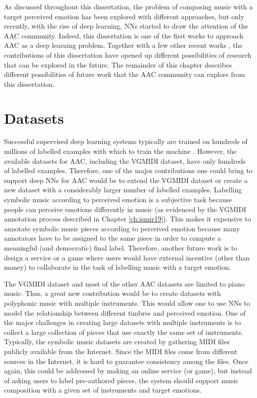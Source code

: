 As discussed throughout this dissertation, the problem of composing music with a target perceived emotion has been explored with different approaches, but only recently, with the rise of deep learning, NNs started to draw the attention of the AAC community.  Indeed, this dissertation is one of the first works to approach AAC as a deep learning problem. Together with a few other recent works \cite{madhok2018sentimozart,tan2020automated,zhao2019emotional, tan2020music}, the contributions of this dissertation have opened up different possibilities of research that can be explored in the future. The remainder of this chapter describes different possibilities of future work that the AAC community can explore from this dissertation.

\section{Datasets}

Successful supervised deep learning systems typically are trained on hundreds of millions of labelled examples with which to train the machine \cite{lecun2015deep}. However, the available datasets for AAC, including the VGMIDI dataset, have only hundreds of labelled examples. Therefore, one of the major contributions one could bring to support deep NNs for AAC would be to extend the VGMIDI dataset or create a new dataset with a considerably larger number of labelled examples. Labelling symbolic music according to perceived emotion is a subjective task because people can perceive emotions differently in music (as evidenced by the VGMIDI annotation process described in Chapter \ref{ch:ismir19}). This makes it expensive to annotate symbolic music pieces according to perceived emotion because many annotators have to be assigned to the same piece in order to compute a meaningful (and democratic) final label. Therefore, another future work is to design a service or a game \cite{Law2007TagATuneAG} where users would have external incentive (other than money) to collaborate in the task of labelling music with a target emotion.

The VGMIDI dataset and most of the other AAC datasets are limited to piano music. Thus, a great new contribution would be to create datasets with polyphonic music with multiple instruments. This would allow one to use NNs to model the relationship between different timbres and perceived emotion. One of the major challenges in creating large datasets with multiple instruments is to collect a large collection of pieces that use exactly the same set of instruments. Typically, the symbolic music datasets are created by gathering MIDI files publicly available from the Internet.  Since the MIDI files come from different sources in the Internet, it is hard to guarantee consistency among the files. Once again, this could be addressed by making an online service (or game), but instead of asking users to label pre-authored pieces, the system should support music composition with a given set of instruments and target emotions.

